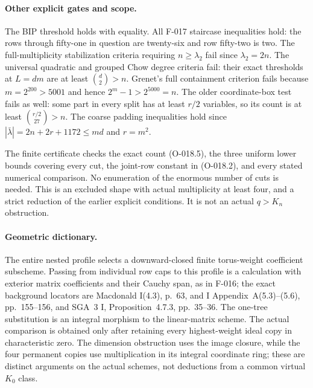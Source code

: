 \paragraph{Other explicit gates and scope.}
The BIP threshold holds with equality. All F-017 staircase
inequalities hold: the rows through fifty-one in question
are twenty-six and row fifty-two is two. The full-multiplicity
stabilization criteria requiring $n\geq\lambda_2$ fail
since $\lambda_2=2n$. The universal quadratic and grouped
Chow degree criteria fail: their exact thresholds at $L=dm$
are at least $\binom d2>n$.
Grenet's full containment criterion fails because
$m=2^{200}>5001$ and hence $2^m-1>2^{5000}=n$.
The older coordinate-box test fails as well: some part in
every split has at least $r/2$ variables, so its count is
at least $\binom{r/2}{27}>n$.
The coarse padding inequalities hold since
$|\bar\lambda|=2n+2r+1172\leq md$ and $r=m^2$.

The finite certificate checks the exact count (O-018.5),
the three uniform lower bounds covering every cut, the
joint-row constant in (O-018.2), and every stated numerical
comparison. No enumeration of the enormous number of cuts
is needed. This is an excluded shape with actual multiplicity
at least four, and a strict reduction of the earlier explicit
conditions. It is not an actual $q>K_n$ obstruction.

\paragraph{Geometric dictionary.}
The entire nested profile selects a downward-closed finite
torus-weight coefficient subscheme. Passing from individual
row caps to this profile is a calculation with exterior
matrix coefficients and their Cauchy span, as in F-016;
the exact background locators are Macdonald I(4.3), p.~63,
and I Appendix~A(5.3)--(5.6), pp.~155--156, and SGA~3 I,
Proposition~4.7.3, pp.~35--36. The one-tree substitution is
an integral morphism to the linear-matrix scheme. The actual
comparison is obtained only after retaining every
highest-weight ideal copy in characteristic zero. The
dimension obstruction uses the image closure, while the
four permanent copies use multiplication in its integral
coordinate ring; these are distinct arguments on the actual
schemes, not deductions from a common virtual $K_0$ class.
